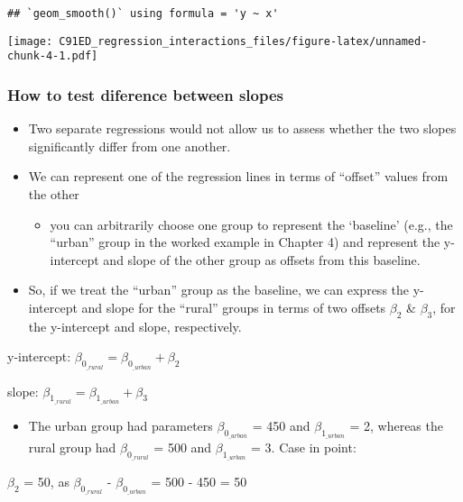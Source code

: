 \documentclass[
]{article}
\providecommand{\tightlist}{%
  \setlength{\itemsep}{0pt}\setlength{\parskip}{0pt}}
\begin{document}
\begin{verbatim}
## `geom_smooth()` using formula = 'y ~ x'
\end{verbatim}

\texttt{[image: C91ED\_regression\_interactions\_files/figure-latex/unnamed-chunk-4-1.pdf]}

\hypertarget{how-to-test-diference-between-slopes}{%
\subsubsection{How to test diference between
slopes}\label{how-to-test-diference-between-slopes}}

\begin{itemize}
\tightlist
\item
  Two separate regressions would not allow us to assess whether the two
  slopes significantly differ from one another.
\item
  We can represent one of the regression lines in terms of ``offset''
  values from the other

  \begin{itemize}
  \tightlist
  \item
    you can arbitrarily choose one group to represent the `baseline'
    (e.g., the ``urban'' group in the worked example in Chapter 4) and
    represent the y-intercept and slope of the other group as offsets
    from this baseline.
  \end{itemize}
\item
  So, if we treat the ``urban'' group as the baseline, we can express
  the y-intercept and slope for the ``rural'' groups in terms of two
  offsets \(\beta_{2}\) \& \(\beta_{3}\), for the y-intercept and slope,
  respectively.
\end{itemize}

y-intercept:
\(\beta_{0_\textit{_rural}} = \beta_{0_\textit{_urban}} + \beta_{2}\)

slope:
\(\beta_{1_\textit{_rural}} = \beta_{1_\textit{_urban}} + \beta_{3}\)

\begin{itemize}
\tightlist
\item
  The urban group had parameters \(\beta_{0_\textit{_urban}}\) = 450 and
  \(\beta_{1_\textit{_urban}}\) = 2, whereas the rural group had
  \(\beta_{0_\textit{_rural}}\) = 500 and \(\beta_{1_\textit{_urban}}\)
  = 3. Case in point:
\end{itemize}

\(\beta_{2}\) = 50, as \(\beta_{0_\textit{_rural}}\) -
\(\beta_{0_\textit{_urban}}\) = 500 - 450 = 50
\end{document}
